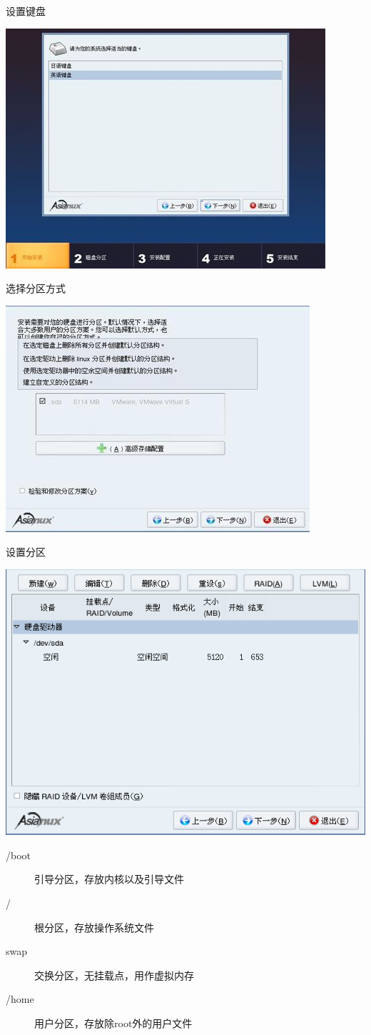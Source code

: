 \begin{frame}{设置键盘}

\includegraphics[width=.5\textwidth]{images/axs3-install/keyboard}

\end{frame}
\begin{frame}{选择分区方式}

\includegraphics[width=.5\textwidth]{images/axs3-install/partition-method}
\end{frame}

\begin{frame}{设置分区}

\includegraphics[height=.5\textheight]{images/axs3-install/partition-setup}

\pause
\begin{description}
	\item[/boot] 	 			 \small{引导分区，存放内核以及引导文件}
	\item [/]	根分区，存放操作系统文件
	\item [swap] 交换分区，无挂载点，用作虚拟内存
	\item [/home] 用户分区，存放除root外的用户文件
\end{description}

\end{frame}

